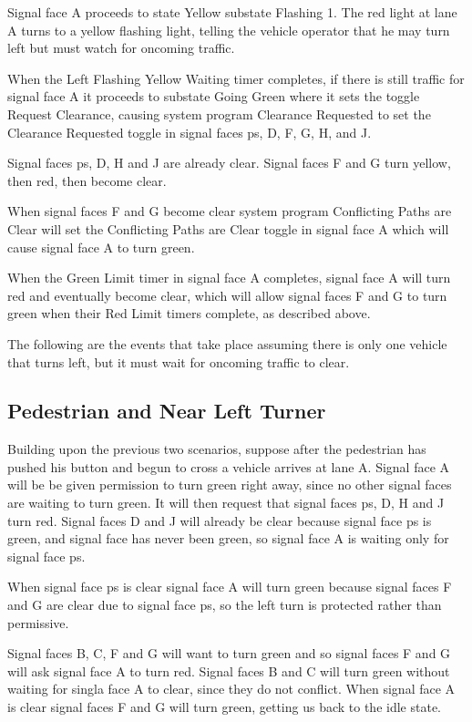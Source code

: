 \documentclass[letterpaper,twoside]{article}
\begin{document}
Signal face A proceeds to state Yellow substate Flashing 1.  The red light
at lane A turns to a yellow flashing light, telling the vehicle operator
that he may turn left but must watch for oncoming traffic.

When the Left Flashing Yellow Waiting timer completes, if there is still
traffic for
signal face A it proceeds to substate Going Green where it sets the
toggle Request Clearance, causing system program Clearance Requested to
set the Clearance Requested toggle in signal faces ps, D, F, G, H, and J.

Signal faces ps, D, H and J are already clear.  Signal faces F and G turn
yellow, then red, then become clear.

When signal faces F and G become clear system program Conflicting Paths
are Clear will set the Conflicting Paths are Clear toggle in signal face
A which will cause signal face A to turn green.

When the Green Limit timer in signal face A completes, signal face
A will turn red and eventually become clear, which will allow
signal faces F and G to turn green when their Red Limit timers complete,
as described above.

The following are the events that take place assuming there is only
one vehicle that turns left, but it must wait for oncoming traffic
to clear.



\subsection{Pedestrian and Near Left Turner}

Building upon the previous two scenarios, suppose after the pedestrian
has pushed his button and begun to cross a vehicle arrives at lane A.
Signal face A will be be given permission to turn green right away, since no
other signal faces are waiting to turn green.  It will then request
that signal faces ps, D, H and J turn red.  Signal faces D and J
will already be clear because signal face ps is green, and signal face
has never been green, so signal face A is waiting only for signal face ps.

When signal face ps is clear signal face A will turn green because
signal faces F and G are clear due to signal face ps, so the left turn
is protected rather than permissive.

Signal faces B, C, F and G will want to turn green and so signal faces
F and G will ask signal face A to turn red.  Signal faces B and C
will turn green without waiting for singla face A to clear, since
they do not conflict.  When signal face A is clear signal faces
F and G will turn green, getting us back to the idle state.
\end{document}
